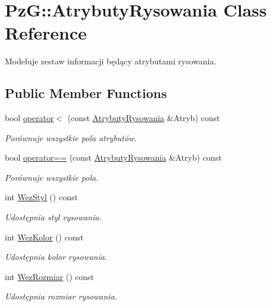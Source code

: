 \hypertarget{class_pz_g_1_1_atrybuty_rysowania}{}\section{PzG\+::Atrybuty\+Rysowania Class Reference}
\label{class_pz_g_1_1_atrybuty_rysowania}


Modeluje zestaw informacji będący atrybutami rysowania.  


\subsection*{Public Member Functions}
\begin{DoxyCompactItemize}
\item 
bool \mbox{\hyperlink{class_pz_g_1_1_atrybuty_rysowania_aeae8811cf8c6eef100fdae0322b8f650}{operator$<$}} (const \mbox{\hyperlink{class_pz_g_1_1_atrybuty_rysowania}{Atrybuty\+Rysowania}} \&Atryb) const
\begin{DoxyCompactList}\small\item\em Porównuje wszystkie pola atrybutów. \end{DoxyCompactList}\item 
bool \mbox{\hyperlink{class_pz_g_1_1_atrybuty_rysowania_ae04bb7af0a1cc5fe885373f2b1271ee4}{operator==}} (const \mbox{\hyperlink{class_pz_g_1_1_atrybuty_rysowania}{Atrybuty\+Rysowania}} \&Atryb) const
\begin{DoxyCompactList}\small\item\em Porównuje wszystkie pola. \end{DoxyCompactList}\item 
int \mbox{\hyperlink{class_pz_g_1_1_atrybuty_rysowania_a85f1665049d64618e1ac1d18c000ff76}{Wez\+Styl}} () const
\begin{DoxyCompactList}\small\item\em Udostępnia styl rysowania. \end{DoxyCompactList}\item 
int \mbox{\hyperlink{class_pz_g_1_1_atrybuty_rysowania_a27e26e90c6e5ccf76188e16fb81b2644}{Wez\+Kolor}} () const
\begin{DoxyCompactList}\small\item\em Udostępnia kolor rysowania. \end{DoxyCompactList}\item 
int \mbox{\hyperlink{class_pz_g_1_1_atrybuty_rysowania_a9f0f08bb69dca9c12e7f55c165c6223e}{Wez\+Rozmiar}} () const
\begin{DoxyCompactList}\small\item\em Udostępnia rozmiar rysowania. \end{DoxyCompactList}\item 

\end{DoxyCompactItemize}
